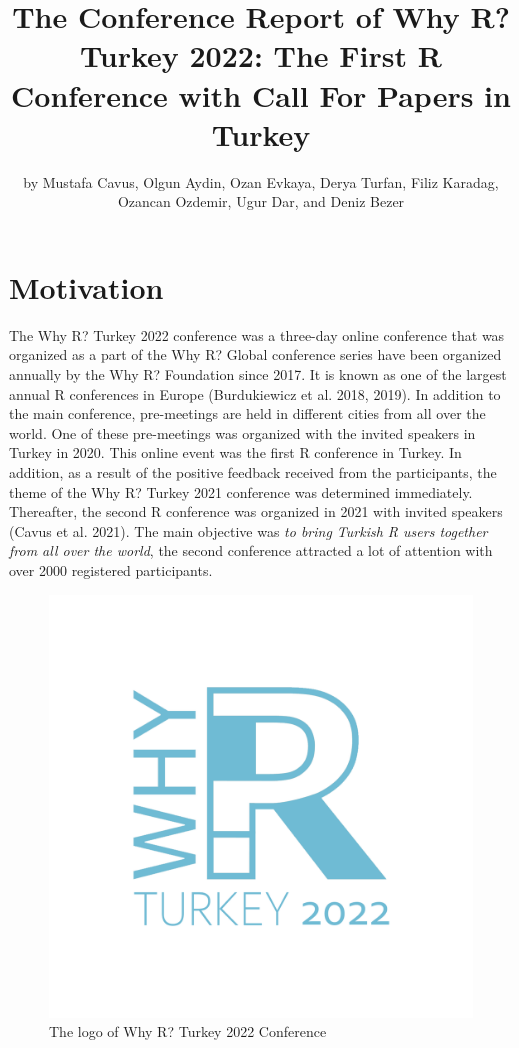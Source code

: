 \title{The Conference Report of Why R? Turkey 2022: The First R Conference with Call For Papers in Turkey}
\author{by Mustafa Cavus, Olgun Aydin, Ozan Evkaya, Derya Turfan, Filiz Karadag, Ozancan Ozdemir, Ugur Dar, and Deniz Bezer}

\maketitle


\hypertarget{motivation}{%
\section{Motivation}\label{motivation}}

The Why R? Turkey 2022 conference was a three-day online conference that was organized as a part of the Why R? Global conference series have been organized annually by the Why R? Foundation since 2017. It is known as one of the largest annual R conferences in Europe (Burdukiewicz et al. 2018, 2019). In addition to the main conference, pre-meetings are held in different cities from all over the world. One of these pre-meetings was organized with the invited speakers in Turkey in 2020. This online event was the first R conference in Turkey. In addition, as a result of the positive feedback received from the participants, the theme of the Why R? Turkey 2021 conference was determined immediately. Thereafter, the second R conference was organized in 2021 with invited speakers (Cavus et al. 2021). The main objective was \emph{to bring Turkish R users together from all over the world}, the second conference attracted a lot of attention with over 2000 registered participants.

\begin{figure}

{\centering \includegraphics[width=0.4\linewidth]{figure1} 

}

\caption{The logo of Why R? Turkey 2022 Conference}\label{fig:figure1}
\end{figure}

